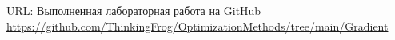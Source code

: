 \documentclass[../body.tex]{subfiles}
\begin{document}
URL: Выполненная лабораторная работа на GitHub \\ \url{https://github.com/ThinkingFrog/OptimizationMethods/tree/main/Gradient}
\end{document}
